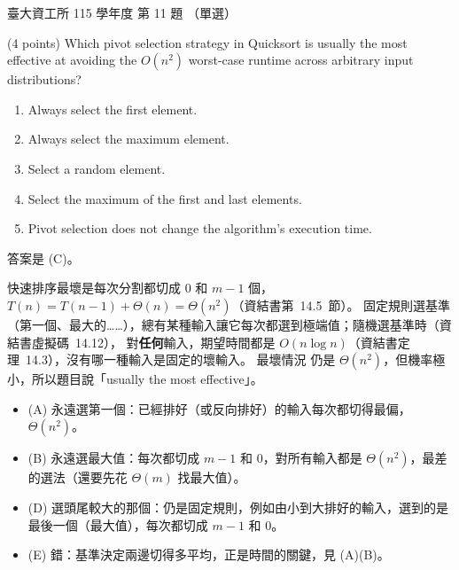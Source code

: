 \begin{pastexam}[label={px:ntu-115-dsa-11}]{臺大資工所 115 學年度 第 11 題}
（單選）

(4 points) Which pivot selection strategy in Quicksort is usually the most effective at avoiding the $O(n^2)$ worst-case runtime across arbitrary input distributions?


\begin{enumerate}[label=(\Alph*)]
\item Always select the first element.
\item Always select the maximum element.
\item Select a random element.
\item Select the maximum of the first and last elements.
\item Pivot selection does not change the algorithm's execution time.
\end{enumerate}
\end{pastexam}

\begin{pastsoln}
答案是 (C)。

快速排序最壞是每次分割都切成 $0$ 和 $m - 1$ 個，$T(n) = T(n-1) + \Theta(n) = \Theta(n^2)$（資結書第~14.5~節）。
固定規則選基準（第一個、最大的……），總有某種輸入讓它每次都選到極端值；隨機選基準時（資結書虛擬碼~14.12），
對\textbf{任何}輸入，期望時間都是 $O(n \log n)$（資結書定理~14.3），沒有哪一種輸入是固定的壞輸入。 最壞情況
仍是 $\Theta(n^2)$，但機率極小，所以題目說「usually the most effective」。
\begin{itemize}
\item (A) 永遠選第一個：已經排好（或反向排好）的輸入每次都切得最偏，$\Theta(n^2)$。
\item (B) 永遠選最大值：每次都切成 $m - 1$ 和 $0$，對所有輸入都是 $\Theta(n^2)$，最差的選法（還要先花
$\Theta(m)$ 找最大值）。
\item (D) 選頭尾較大的那個：仍是固定規則，例如由小到大排好的輸入，選到的是最後一個（最大值），每次都切成
$m - 1$ 和 $0$。
\item (E) 錯：基準決定兩邊切得多平均，正是時間的關鍵，見 (A)(B)。
\end{itemize}
\end{pastsoln}
